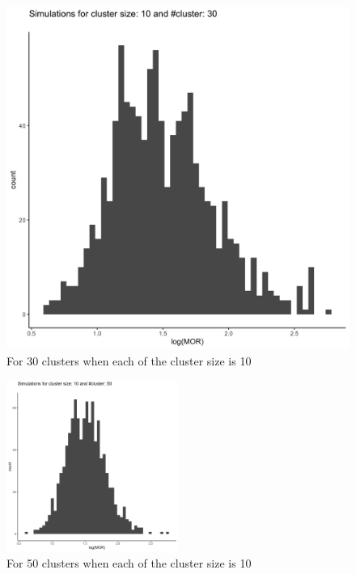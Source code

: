 \documentclass[
  letterpaper,
  DIV=11,
  numbers=noendperiod]{scrartcl}
\begin{document}
\begin{figure}
\begin{minipage}[t]{0.44\linewidth}
{{\includegraphics{../plots/hist_30_10.png}

}

\caption{For 30 clusters when each of the cluster size is 10}

}

\end{minipage}%

\end{figure}

\vspace{5mm}

\begin{figure}[H]

{\centering \includegraphics[width=0.5\textwidth,height=\textheight]{../plots/hist_50_10.png}

}

\caption{For 50 clusters when each of the cluster size is 10}

\end{figure}
\end{document}
